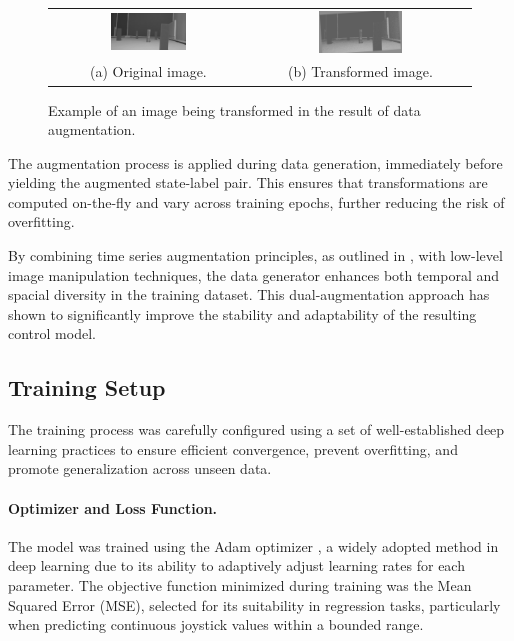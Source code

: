 \begin{figure}[htbp]
  \centering
  \begin{tabu}{cc}
    \includegraphics[width=0.4\textwidth]{Images/Augmentation/original.png} & \includegraphics[width=0.4\textwidth]{Images/Augmentation/transformed.png} \\
    \parbox{0.4\textwidth}{\centering (a) Original image.} &
    \parbox{0.4\textwidth}{\centering (b) Transformed image.}
  \end{tabu}
  \caption{Example of an image being transformed in the result of data augmentation.}
  \label{fig:augmentation_transformations}
\end{figure}

The augmentation process is applied during data generation, immediately before yielding the augmented state-label pair. This ensures that transformations are computed on-the-fly and vary across training epochs, further reducing the risk of overfitting.

By combining time series augmentation principles, as outlined in \autocite{iglesias2023data}, with low-level image manipulation techniques, the data generator enhances both temporal and spacial diversity in the training dataset. This dual-augmentation approach has shown to significantly improve the stability and adaptability of the resulting control model.

\subsection{Training Setup}
\label{sec:trainingsetup}

The training process was carefully configured using a set of well-established deep learning practices to ensure efficient convergence, prevent overfitting, and promote generalization across unseen data.

\paragraph{Optimizer and Loss Function.}
The model was trained using the Adam optimizer \autocite{kingma2015adam}, a widely adopted method in deep learning due to its ability to adaptively adjust learning rates for each parameter. The objective function minimized during training was the Mean Squared Error (MSE), selected for its suitability in regression tasks, particularly when predicting continuous joystick values within a bounded range.

